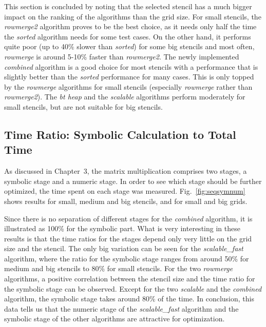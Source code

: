 This section is concluded by noting that the selected stencil has a much bigger impact on the ranking of the algorithms than the grid size. For small stencils, the \textit{rowmerge2} algorithm proves to be the best choice, as it needs only half the time the \textit{sorted} algorithm needs for some test cases. On the other hand, it performs quite poor (up to 40\% slower than \textit{sorted}) for some big stencils and most often, \textit{rowmerge} is around 5-10\% faster than \textit{rowmerge2}. The newly implemented \textit{combined} algorithm is a good choice for most stencils with a performance that is slightly better than the \textit{sorted} performance for many cases. This is only topped by the \textit{rowmerge} algorithms for small stencils (especially \textit{rowmerge} rather than \textit{rowmerge2}). The \textit{bt heap} and the \textit{scalable} algorithms perform moderately for small stencils, but are not suitable for big stencils.

\subsection{Time Ratio: Symbolic Calculation to Total Time}
As discussed in Chapter~3, the matrix multiplication comprises two stages, a symbolic stage and a numeric stage. In order to see which stage should be further optimized, the time spent on each stage was measured. Fig.~\ref{fig:seqsymnum} shows results for small, medium and big stencils, and for small and big grids. 

Since there is no separation of different stages for the \textit{combined} algorithm, it is illustrated as 100\% for the symbolic part. What is very interesting in these results is that the time ratios for the stages depend only very little on the grid size and the stencil. The only big variation can be seen for the \textit{scalable\_fast} algorithm, where the ratio for the symbolic stage ranges from around 50\% for medium and big stencils to 80\% for small stencils. For the two \textit{rowmerge} algorithms, a positive correlation between the stencil size and the time ratio for the symbolic stage can be observed. Except for the two \textit{scalable} and the \textit{combined} algorithm, the symbolic stage takes around 80\% of the time. In conclusion, this data tells us that the numeric stage of the \textit{scalable\_fast} algorithm and the symbolic stage of the other algorithms are attractive for optimization.

